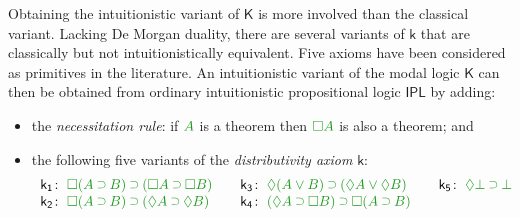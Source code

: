 \documentclass[a4paper]{article}
\theoremstyle{plain}
\theoremstyle{definition}
\newcommand*{\ax}[1]{\mathsf{#1}}
\newcommand*{\kax}[1][]		{\ax{k_{#1}}}
\newcommand*{\IK}{\mathsf{IK}}
\newcommand*{\K}{\mathsf{K}}
\newcommand*{\OR}{\mathbin{\vee}}
\newcommand*{\BOT}{\mathord{\bot}}
\newcommand*{\IMP}{\mathbin{\scalebox{.9}{\raise.2ex\hbox{$\supset$}}}}
\newcommand*{\BOX}{\mathord{\Box}}
\newcommand*{\DIA}{\mathord{\Diamond}}
\newcommand*{\fm}[1]{{\color{notgreen}{#1}}}
\newcommand*{\rn}[1]  {\ensuremath{\mathsf{#1}}}
\begin{document}
Obtaining the intuitionistic variant of $\mathsf{K}$ is more involved than the classical variant. 
Lacking De Morgan duality, there are several variants of $\mathsf{k}$ that are classically but not intuitionistically equivalent. Five axioms have been considered as primitives in the literature. An intuitionistic variant of the modal logic $\K$ can then be obtained from ordinary intuitionistic propositional logic $\rn{IPL}$ by adding:
%

\begin{itemize}
	\item the \emph{necessitation rule}: if $\fm A$ is a theorem then $\fm{\BOX A}$ is also a theorem; and
	\item the following five variants of the \emph{distributivity axiom} $\rn{k}$:
	\begin{equation*}
	\label{eq:ik}%
	\begin{array}[t]{r@{\;}l@{\qquad}r@{\;}l@{\qquad}r@{\;}l}
	\kax[1]\colon&\fm{\BOX(A\IMP B)\IMP(\BOX A\IMP\BOX B)}
	&
	\kax[3]\colon&\fm{\DIA(A\OR B)\IMP(\DIA A\OR\DIA B)}
	&
	\kax[5]\colon&\fm{\DIA\BOT\IMP\BOT}
	\\
	\kax[2]\colon&\fm{\BOX(A\IMP B)\IMP(\DIA A\IMP\DIA B)}
	&
	\kax[4]\colon&\fm{(\DIA A\IMP \BOX B)\IMP\BOX(A\IMP B)}\\%
	\end{array}
	\end{equation*}
\end{itemize}
\end{document}
